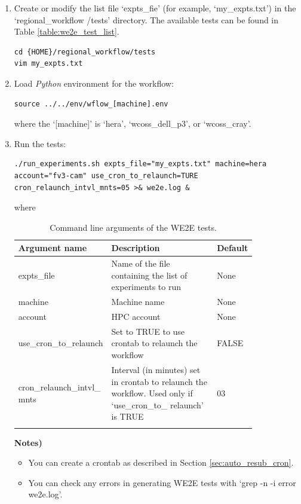 \documentclass[11pt,fleqn]{report}              %
\begin{document}
\begin{enumerate}
\item Create or modify the list file `expts\_fie' (for example, `my\_expts.txt') in the `regional\_workflow /tests' directory. The available tests can be found in Table \ref{table:we2e_test_list}.
\lstset{language=bash}   
\begin{lstlisting}[frame=trBL]
cd {HOME}/regional_workflow/tests
vim my_expts.txt 
\end{lstlisting}

\item Load {\it Python} environment for the workflow:
\lstset{language=bash}   
\begin{lstlisting}[frame=trBL]
source ../../env/wflow_[machine].env
\end{lstlisting}
where the `[machine]' is `hera', `wcoss\_dell\_p3', or `wcoss\_cray'. 

\item Run the tests:
\lstset{language=bash}   
\begin{lstlisting}[frame=trBL]
./run_experiments.sh expts_file="my_expts.txt" machine=hera account="fv3-cam" use_cron_to_relaunch=TURE cron_relaunch_intvl_mnts=05 >& we2e.log &
\end{lstlisting}
where
{
\fontsize{10}{12}\selectfont
\begin{longtable}{p{0.21\linewidth} | p{0.55\linewidth} | p{0.07\linewidth} }
\hline
\hline
Argument name & Description & Default \\
\hline
 expts\_file & Name of the file containing the list of experiments to run & None \\
 machine & Machine name & None \\
 account & HPC account & None \\
 use\_cron\_to\_relaunch & Set to TRUE to use crontab to relaunch the workflow & FALSE \\
 cron\_relaunch\_intvl\_ mnts & Interval (in minutes) set in crontab to relaunch the workflow. Used only if `use\_cron\_to\_ relaunch' is TRUE & 03 \\
\hline
\caption{Command line arguments of the WE2E tests.}
\label{table:we2e_command_arg}
\end{longtable}
}
\vspace{-0.5cm}
{\bf Notes)} 
\begin{itemize}
\item You can create a crontab as described in Section \ref{sec:auto_resub_cron}.
\item You can check any errors in generating WE2E tests with `grep -n -i error we2e.log'.
\end{itemize}


\end{enumerate}
\end{document}
